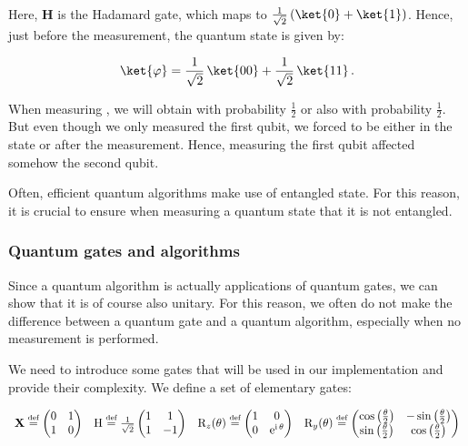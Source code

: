 \documentclass[11pt, a4paper]{article}
\begin{document}
                Here, \(\mathbf{H}\) is the Hadamard gate, which maps  to \(\frac{1}{\sqrt{2}}\,(\ket{0} + \ket{1})\). Hence, just before the measurement, the quantum state is given by:
                
                \[\ket{\varphi}=\frac{1}{\sqrt{2}}\,\ket{00} + \frac{1}{\sqrt{2}}\,\ket{11}\,.\]
                
                When measuring \ket{\varphi}, we will obtain   with probability \(\frac12\) or  also with probability \(\frac12\). But even though we only measured the first qubit, we forced \ket{\varphi} to be either in the state  or  after the measurement. Hence, measuring the first qubit affected somehow the second qubit.
                
                Often, efficient quantum algorithms make use of entangled state. For this reason, it is crucial to ensure when measuring a quantum state that it is not entangled.
            \subsubsection{Quantum gates and algorithms}
                Since a quantum algorithm is actually applications of quantum gates, we can show that it is of course also unitary. For this reason, we often do not make the difference between a quantum gate and a quantum algorithm, especially when no measurement is performed.
                
                We need to introduce some gates that will be used in our implementation and provide their complexity. We define a set of elementary gates:
                
                \[\begin{array}{ccccccc}\X\overset{\text{\tiny{def}}}{=}\begin{pmatrix}0 & 1\\1 & 0\end{pmatrix} & \mathrm{H}\overset{\text{\tiny{def}}}{=}\frac{1}{\sqrt{2}}\begin{pmatrix}1 & 1\\1 & -1\end{pmatrix}&\mathrm{R}_{z}(\theta)\overset{\text{\tiny{def}}}{=}\begin{pmatrix}1 & 0\\0 & \mathrm{e}^{\mathrm{i}\,\theta}\end{pmatrix}&\mathrm{R}_y(\theta)\overset{\text{\tiny{def}}}{=}\begin{pmatrix}\cos\left(\frac\theta2\right) & -\sin\left(\frac\theta2\right)\\\sin\left(\frac{\theta}{2}\right) & \cos\left(\frac\theta2\right)\end{pmatrix}\end{array}\]
                
\end{document}
